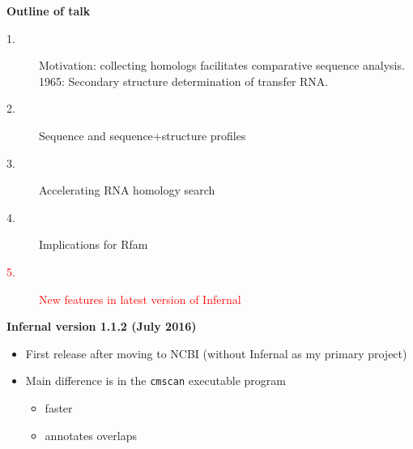 \documentclass[landscape]{slides}
\begin{document}
\begin{slide}
\begin{center}
\textbf{Outline of talk}

\begin{description}
\item[1.] Motivation: collecting homologs facilitates comparative
  sequence analysis.\\ 1965: Secondary structure determination of
  transfer RNA.
\item[2.] Sequence and sequence+structure profiles
\item[3.] Accelerating RNA homology search
\item[4.] Implications for Rfam
\item[\textcolor{red}{5.}] \textcolor{red}{New features in latest version of Infernal}
\end{description}

\end{center}
\vfill
\end{slide}
\begin{slide}
\begin{center}
\textbf{Infernal version 1.1.2 (July 2016)} \\
\end{center}

\medskip
\begin{itemize}
\item First release after moving to NCBI (without Infernal as my primary project)
\item Main difference is in the \texttt{cmscan} executable program 
\begin{itemize}
  \item faster
  \item annotates overlaps
\end{itemize}
\end{itemize}


\vfill
\end{slide}
\end{document}
